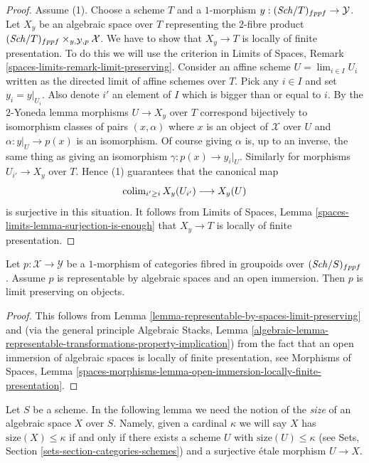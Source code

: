\begin{proof}
\medskip\noindent
Assume (1). Choose a scheme $T$ and a $1$-morphism
$y : (\mathit{Sch}/T)_{fppf} \to \mathcal{Y}$. Let
$X_y$ be an algebraic space over $T$ representing the $2$-fibre product
$(\mathit{Sch}/T)_{fppf} \times_{y, \mathcal{Y}, p} \mathcal{X}$.
We have to show that $X_y \to T$ is locally of finite presentation.
To do this we will use the criterion in
Limits of Spaces, Remark \ref{spaces-limits-remark-limit-preserving}.
Consider an affine scheme $U = \lim_{i \in I} U_i$ written as the
directed limit of affine schemes over $T$.
Pick any $i \in I$ and set $y_i = y|_{U_i}$. Also denote $i'$ an element
of $I$ which is bigger than or equal to $i$. By the $2$-Yoneda lemma
morphisms $U \to X_y$ over $T$ correspond bijectively
to isomorphism classes of pairs $(x, \alpha)$ where $x$ is an object
of $\mathcal{X}$ over $U$ and $\alpha : y|_U \to p(x)$ is an isomorphism.
Of course giving $\alpha$ is, up to an inverse, the same thing as giving
an isomorphism $\gamma : p(x) \to y_i|_U$.
Similarly for morphisms $U_{i'} \to X_y$ over $T$. Hence (1) guarantees
that the canonical map
$$
\mathop{\mathrm{colim}}\nolimits_{i' \geq i} X_y(U_{i'}) \longrightarrow X_y(U)
$$
is surjective in this situation. It follows from
Limits of Spaces, Lemma \ref{spaces-limits-lemma-surjection-is-enough}
that $X_y \to T$ is locally of finite presentation.
\end{proof}

\begin{lemma}
\label{lemma-open-immersion-limit-preserving}
Let $p : \mathcal{X} \to \mathcal{Y}$ be a $1$-morphism of categories
fibred in groupoids over $(\mathit{Sch}/S)_{fppf}$. Assume $p$ is representable
by algebraic spaces and an open immersion. Then $p$ is limit preserving
on objects.
\end{lemma}

\begin{proof}
This follows from
Lemma \ref{lemma-representable-by-spaces-limit-preserving}
and (via the general principle
Algebraic Stacks, Lemma
\ref{algebraic-lemma-representable-transformations-property-implication})
from the fact that an open immersion of algebraic spaces is
locally of finite presentation, see
Morphisms of Spaces, Lemma
\ref{spaces-morphisms-lemma-open-immersion-locally-finite-presentation}.
\end{proof}

\noindent
Let $S$ be a scheme. In the following lemma we need the notion of the
{\it size} of an algebraic space $X$ over $S$. Namely, given a cardinal
$\kappa$ we will say $X$ has $\text{size}(X) \leq \kappa$ if and only
if there exists a scheme $U$ with $\text{size}(U) \leq \kappa$ (see
Sets, Section \ref{sets-section-categories-schemes}) and a surjective
\'etale morphism $U \to X$.

